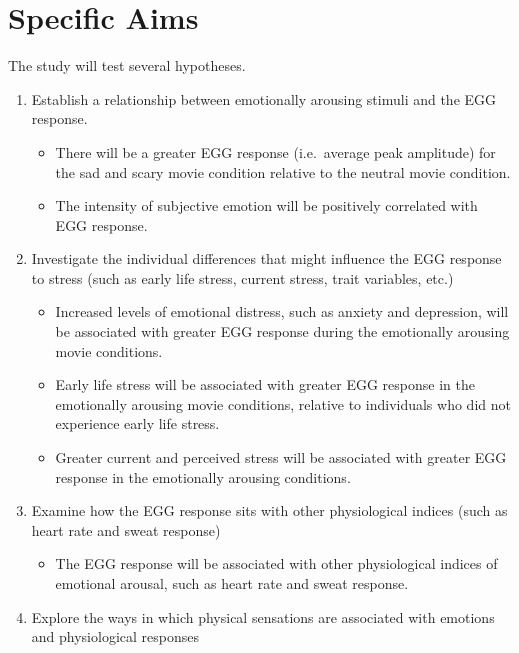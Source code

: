 \documentclass[]{book}
\providecommand{\tightlist}{%
  \setlength{\itemsep}{0pt}\setlength{\parskip}{0pt}}
\begin{document}
\hypertarget{specific-aims-1}{%
\section{Specific Aims}\label{specific-aims-1}}

The study will test several hypotheses.

\begin{enumerate}
\def\labelenumi{\arabic{enumi}.}
\tightlist
\item
  Establish a relationship between emotionally arousing stimuli and the EGG response.

  \begin{itemize}
  \tightlist
  \item
    There will be a greater EGG response (i.e.~average peak amplitude) for the sad and scary movie condition relative to the neutral movie condition.
  \item
    The intensity of subjective emotion will be positively correlated with EGG response.
  \end{itemize}
\item
  Investigate the individual differences that might influence the EGG response to stress (such as early life stress, current stress, trait variables, etc.)

  \begin{itemize}
  \tightlist
  \item
    Increased levels of emotional distress, such as anxiety and depression, will be associated with greater EGG response during the emotionally arousing movie conditions.
  \item
    Early life stress will be associated with greater EGG response in the emotionally arousing movie conditions, relative to individuals who did not experience early life stress.
  \item
    Greater current and perceived stress will be associated with greater EGG response in the emotionally arousing conditions.
  \end{itemize}
\item
  Examine how the EGG response sits with other physiological indices (such as heart rate and sweat response)

  \begin{itemize}
  \tightlist
  \item
    The EGG response will be associated with other physiological indices of emotional arousal, such as heart rate and sweat response.
  \end{itemize}
\item
  Explore the ways in which physical sensations are associated with emotions and physiological responses


\end{enumerate}
\end{document}
